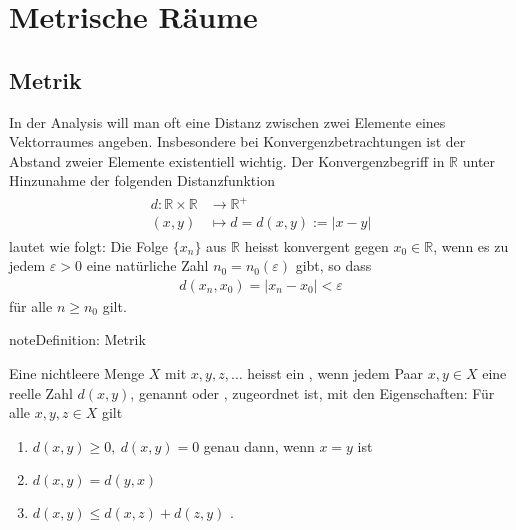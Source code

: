 \documentclass[letterpaper,10pt,english]{jupyterBook}
\begin{document}
\section{Metrische Räume}
\label{\detokenize{Funktionalanalysis/GrundlegendeRaeume:metrische-raume}}

\subsection{Metrik}
\label{\detokenize{Funktionalanalysis/GrundlegendeRaeume:metrik}}
In der Analysis will man oft eine Distanz zwischen zwei Elemente eines Vektorraumes angeben. Insbesondere bei Konvergenzbetrachtungen ist der Abstand zweier Elemente existentiell wichtig. Der Konvergenzbegriff in \(\mathbb{R}\) unter Hinzunahme der folgenden Distanzfunktion
\begin{equation*}
\begin{split}\begin{split} d : \mathbb{R}\times\mathbb{R} & \to \mathbb{R}^+\\
(x,y) & \mapsto  d = d(x,y) := |x-y|\end{split}\end{split}
\end{equation*}
lautet wie folgt: Die Folge \(\{x_n\}\) aus \(\mathbb{R}\) heisst konvergent gegen \(x_0\in\mathbb{R}\), wenn es zu jedem \(\varepsilon > 0\) eine natürliche Zahl \(n_0 = n_0(\varepsilon)\) gibt, so dass
\begin{equation*}
\begin{split}d(x_n,x_0) = |x_n-x_0| < \varepsilon\end{split}
\end{equation*}
für alle \(n \ge n_0\) gilt.

\begin{sphinxadmonition}{note}{Definition: Metrik}

Eine nichtleere Menge \(X\) mit  \(x, y, z, \ldots\) heisst ein , wenn jedem Paar \(x, y \in X\) eine reelle Zahl \(d(x,y)\), genannt  oder , zugeordnet ist, mit den Eigenschaften: Für alle \(x,y,z\in X\) gilt
\begin{enumerate}
%
\item {} 
\(d(x,y) \ge 0,\ d(x,y) = 0\) genau dann, wenn \(x=y\) ist

\item {} 
\(d(x,y) = d(y,x)\) 

\item {} 
\(d(x,y) \le d(x,z) + d(z,y)\) .

\end{enumerate}
\end{sphinxadmonition}
\end{document}
